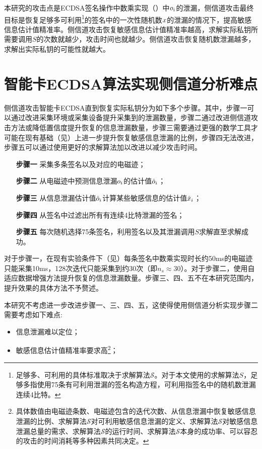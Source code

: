 {	本研究的攻击点是ECDSA签名操作中数乘实现（）中$o_i$的泄漏，侧信道攻击最终目标是恢复足够多可利用\footnote{足够多、可利用的具体标准取决于求解算法$\mathcal S$。对于本文使用的求解算法$S$，足够多指使用75条有可利用泄漏的签名构造方程，可利用指签名中的随机数泄漏连续4比特。}的签名中的一次性随机数$x$的泄漏的情况下，提高敏感信息估计值精准率。侧信道攻击恢复敏感信息估计值精准率越高，求解实际私钥所需要调用$S$的次数就越少，攻击时间也就越少。侧信道攻击恢复随机数泄漏越多，求解出实际私钥的可能性就越大。
	
	\section{智能卡ECDSA算法实现侧信道分析难点}\label{sec:hardpoint}
	
	侧信道攻击智能卡ECDSA直到恢复实际私钥分为如下多个步骤。其中，步骤一可以通过改进采集环境或采集设备提升采集到的泄漏数量，步骤二通过改进侧信道攻击方法或降低置信度提升恢复的信息泄漏数量，步骤三需要通过更强的数学工具才可能在现有基础（见）上进一步提升恢复敏感信息泄漏的比例，步骤四无法改进，步骤五可以通过使用更好的求解算法加以改进以减少攻击时间。
	
	\begin{enumerate}
		\item [\textbf{步骤一}]采集多条签名以及对应的电磁迹；
		\item [\textbf{步骤二}]从电磁迹中预测信息泄漏$o_i$的估计值$\hat {o}_i$；
		\item [\textbf{步骤三}]从信息泄漏估计值$\hat {o}_i$计算某些敏感信息的估计值$\hat {x}_i$；
		\item [\textbf{步骤四}]从签名中过滤出所有有连续4比特泄漏的签名；
		\item [\textbf{步骤五}]每次随机选择75条签名，利用签名以及其泄漏调用$S$求解直至求解成功。
	\end{enumerate}
	
	对于步骤一，在现有实验条件下（见）每条签名中数乘实现时长约50ms的电磁迹只能采集10ms，128次迭代只能采集到约30次（即$n_s\approx30$）。对于步骤二，使用自适应数据增强方法提升恢复的信息泄漏数量。步骤三、四、五不在本研究范围内，提升效果的具体方法不予赘述。
	
	本研究不考虑进一步改进步骤一、三、四、五，这使得使用侧信道分析实现步骤二需要考虑如下难点:
	
	\begin{itemize}
		\item 信息泄漏难以定位；
		\item 敏感信息估计值精准率要求高\footnote{具体数值由电磁迹条数、电磁迹包含的迭代次数、从信息泄漏中恢复敏感信息泄漏的比例、求解算法$\mathcal S$对可利用敏感信息泄漏的定义、求解算法$\mathcal S$对敏感信息泄漏总量的需求、求解算法$\mathcal S$的运行时间、求解算法$\mathcal S$本身的成功率、可以容忍的攻击的时间消耗等多种因素共同决定。}；
	\end{itemize}

}
